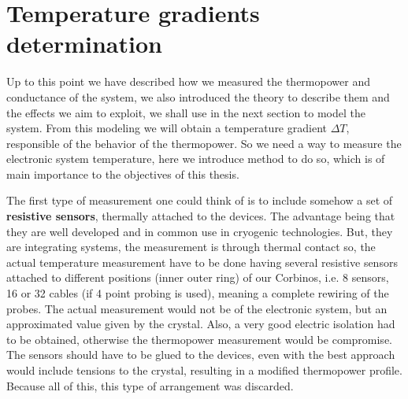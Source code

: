 \chapter{Temperature gradients determination}
\label{ch:temperature_corbino}

Up to this point we have described how we measured the thermopower and conductance of the system, we also introduced the theory to describe them and the effects we aim to exploit, we shall use in the next section to model the system. From this modeling we will obtain a temperature gradient $\Delta T$, responsible of the behavior of the thermopower. So we need a way to measure the electronic system temperature, here we introduce method to do so, which is of main importance to the objectives of this thesis.

The first type of measurement one could think of is to include somehow a set of  \textcolor{azulGris}{\textbf{resistive sensors}}, thermally attached to the devices. The advantage being that they are well developed and in common use in cryogenic technologies. But, they are integrating systems, the measurement is through thermal contact so, the actual temperature measurement have to be done having several resistive sensors attached to different positions (inner outer ring) of our Corbinos, i.e. 8 sensors, 16 or 32 cables (if 4 point probing is used), meaning a complete rewiring of the probes. The actual measurement would not be of the electronic system, but an approximated value given by the crystal. 
Also, a very good electric isolation had to be obtained, otherwise the thermopower measurement would be compromise. 
The sensors should have to be glued to the devices, even with the best approach would include tensions to the crystal, resulting in a modified thermopower profile.
Because all of this, this type of arrangement was discarded.

